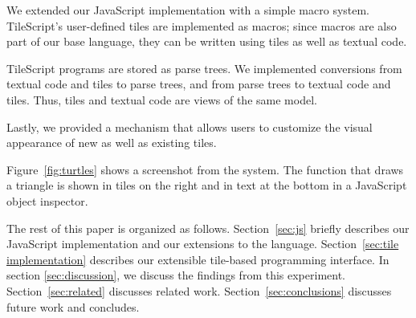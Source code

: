   We extended our JavaScript implementation with a simple macro system.
TileScript's user-defined tiles are implemented as macros; since
macros are also part of our base language, they can be written using
tiles as well as textual code.

  TileScript programs are stored as parse trees.
We implemented conversions from textual code and tiles to parse trees,
and from parse trees to textual code and tiles.
Thus, tiles and textual code are views of the same model.

  Lastly, we provided a mechanism that allows users to customize the
visual appearance of new as well as existing tiles.

  Figure~\ref{fig:turtles} shows a screenshot from the system.  The
function that draws a triangle is shown in tiles on the right and in
text at the bottom in a JavaScript object inspector.

  The rest of this paper is organized as follows.  Section~\ref{sec:js}
briefly describes our JavaScript implementation and our extensions to the language.
Section~\ref{sec:tile implementation} describes our extensible tile-based programming interface.
In section \ref{sec:discussion}, we discuss the findings from
this experiment.
Section~\ref{sec:related} discusses related work.
Section~\ref{sec:conclusions} discusses future work and concludes.
